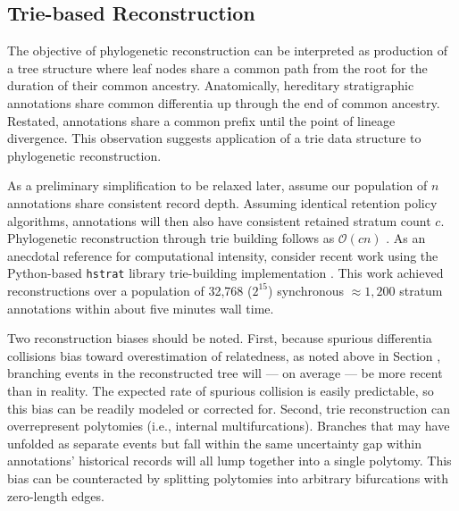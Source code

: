 \subsection{Trie-based Reconstruction}
\label{sec:trie-based-reconstruction}

The objective of phylogenetic reconstruction can be interpreted as production of a tree structure where leaf nodes share a common path from the root for the duration of their common ancestry.
Anatomically, hereditary stratigraphic annotations share common differentia up through the end of common ancestry.
Restated, annotations share a common prefix until the point of lineage divergence.
This observation suggests application of a trie data structure \citep{fredkin1960trie} to phylogenetic reconstruction.

As a preliminary simplification to be relaxed later, assume our population of $n$ annotations share consistent record depth.
Assuming identical retention policy algorithms, annotations will then also have consistent retained stratum count $c$.
Phylogenetic reconstruction through trie building follows as $\mathcal{O}(c n)$ \citep{mehta2018handbook}.
As an anecdotal reference for computational intensity, consider recent work using the Python-based \texttt{hstrat} library trie-building implementation \citep{moreno2023toward}.
This work achieved reconstructions over a population of 32,768 ($2^15$) synchronous $\approx 1,200$ stratum annotations within about five minutes wall time.

Two reconstruction biases should be noted.
First, because spurious differentia collisions bias toward overestimation of relatedness, as noted above in Section , branching events in the reconstructed tree will --- on average --- be more recent than in reality.
The expected rate of spurious collision is easily predictable, so this bias can be readily modeled or corrected for.
Second, trie reconstruction can overrepresent polytomies (i.e., internal multifurcations).
Branches that may have unfolded as separate events but fall within the same uncertainty gap within annotations' historical records will all lump together into a single polytomy.
This bias can be counteracted by splitting polytomies into arbitrary bifurcations with zero-length edges.

